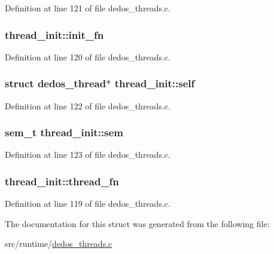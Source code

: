 Definition at line 121 of file dedos\-\_\-threads.\-c.

\hypertarget{structthread__init_a3f5a046298ba770824a83f652ddbc7ae}{
\subsubsection[{init\-\_\-fn}]{ thread\-\_\-init\-::init\-\_\-fn}}\label{structthread__init_a3f5a046298ba770824a83f652ddbc7ae}


Definition at line 120 of file dedos\-\_\-threads.\-c.

\hypertarget{structthread__init_a35c0110fa8e8385bd0c6e823a7e5c30a}{
\subsubsection[{self}]{\setlength{\rightskip}{0pt plus 5cm}struct {\bf dedos\-\_\-thread}$\ast$ thread\-\_\-init\-::self}}\label{structthread__init_a35c0110fa8e8385bd0c6e823a7e5c30a}


Definition at line 122 of file dedos\-\_\-threads.\-c.

\hypertarget{structthread__init_a609ec6696aaa7d760a8154ddee7e8a49}{
\subsubsection[{sem}]{\setlength{\rightskip}{0pt plus 5cm}sem\-\_\-t thread\-\_\-init\-::sem}}\label{structthread__init_a609ec6696aaa7d760a8154ddee7e8a49}


Definition at line 123 of file dedos\-\_\-threads.\-c.

\hypertarget{structthread__init_abbea592e098189df8940eb597cb53ecc}{
\subsubsection[{thread\-\_\-fn}]{ thread\-\_\-init\-::thread\-\_\-fn}}\label{structthread__init_abbea592e098189df8940eb597cb53ecc}


Definition at line 119 of file dedos\-\_\-threads.\-c.



The documentation for this struct was generated from the following file\-:\begin{DoxyCompactItemize}
\item 
src/runtime/\hyperlink{dedos__threads_8c}{dedos\-\_\-threads.\-c}\end{DoxyCompactItemize}
